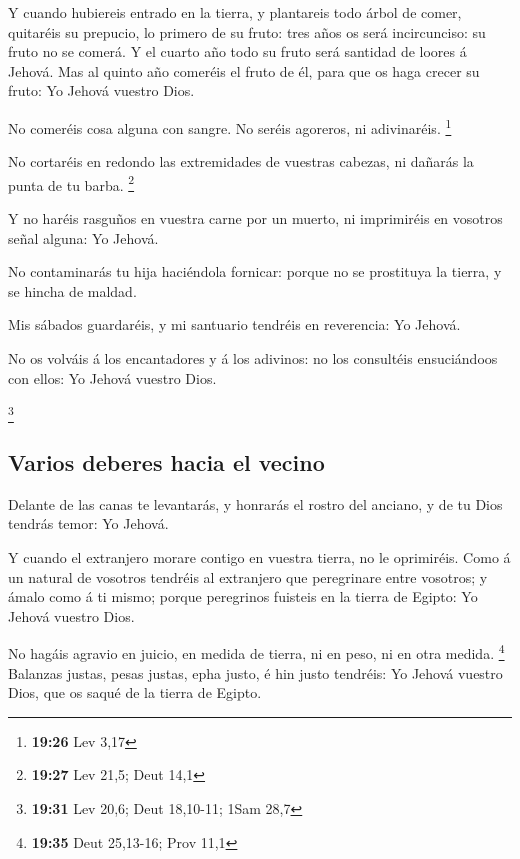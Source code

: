  Y cuando hubiereis entrado en la tierra, y plantareis todo
árbol de comer, quitaréis su prepucio, lo primero de su fruto: tres años
os será incircunciso: su fruto no se comerá.  Y el cuarto
año todo su fruto será santidad de loores á Jehová.  Mas al
quinto año comeréis el fruto de él, para que os haga crecer su fruto: Yo
Jehová vuestro Dios.

 No comeréis cosa alguna con sangre. No seréis agoreros, ni
adivinaréis. \footnote{\textbf{19:26} Lev 3,17}

 No cortaréis en redondo las extremidades de vuestras
cabezas, ni dañarás la punta de tu barba. \footnote{\textbf{19:27} Lev
  21,5; Deut 14,1}

 Y no haréis rasguños en vuestra carne por un muerto, ni
imprimiréis en vosotros señal alguna: Yo Jehová.

 No contaminarás tu hija haciéndola fornicar: porque no se
prostituya la tierra, y se hincha de maldad.

 Mis sábados guardaréis, y mi santuario tendréis en
reverencia: Yo Jehová.

 No os volváis á los encantadores y á los adivinos: no los
consultéis ensuciándoos con ellos: Yo Jehová vuestro Dios.

\footnote{\textbf{19:31} Lev 20,6; Deut 18,10-11; 1Sam 28,7}

\hypertarget{varios-deberes-hacia-el-vecino}{%
\subsection{Varios deberes hacia el
vecino}\label{varios-deberes-hacia-el-vecino}}

 Delante de las canas te levantarás, y honrarás el rostro
del anciano, y de tu Dios tendrás temor: Yo Jehová.

 Y cuando el extranjero morare contigo en vuestra tierra,
no le oprimiréis.  Como á un natural de vosotros tendréis
al extranjero que peregrinare entre vosotros; y ámalo como á ti mismo;
porque peregrinos fuisteis en la tierra de Egipto: Yo Jehová vuestro
Dios.

 No hagáis agravio en juicio, en medida de tierra, ni en
peso, ni en otra medida. \footnote{\textbf{19:35} Deut 25,13-16; Prov
  11,1}  Balanzas justas, pesas justas, epha justo, é hin
justo tendréis: Yo Jehová vuestro Dios, que os saqué de la tierra de
Egipto.

